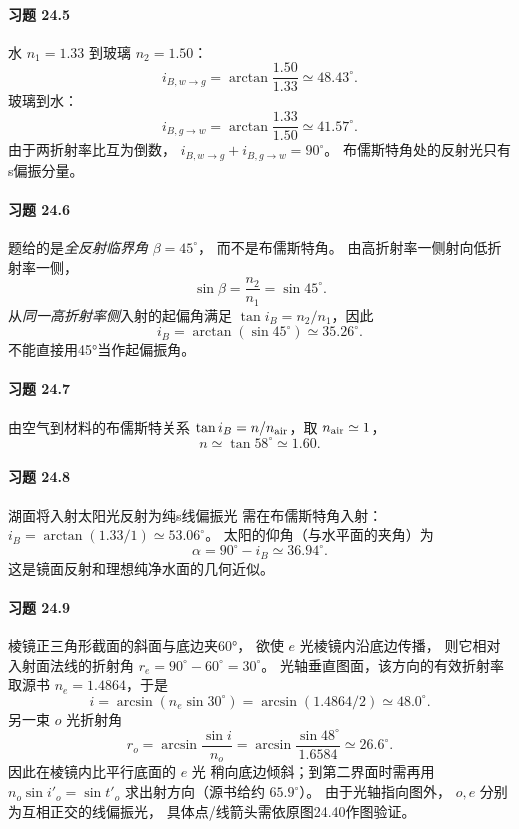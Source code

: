 \paragraph{习题 24.5}
水 \(n_1=1.33\) 到玻璃 \(n_2=1.50\)：
\[
\boxed{i_{B,w\to g}
=\arctan\frac{1.50}{1.33}\simeq48.43^\circ}.
\]
玻璃到水：
\[
\boxed{i_{B,g\to w}
=\arctan\frac{1.33}{1.50}\simeq41.57^\circ}.
\]
由于两折射率比互为倒数，
\(\boxed{i_{B,w\to g}+i_{B,g\to w}=90^\circ}\)。
布儒斯特角处的反射光只有s偏振分量。

\paragraph{习题 24.6}
题给的是\emph{全反射临界角} \(\beta=45^\circ\)，
而不是布儒斯特角。
由高折射率一侧射向低折射率一侧，
\[
\sin\beta=\frac{n_2}{n_1}=\sin45^\circ.
\]
从\emph{同一高折射率侧}入射的起偏角满足
\(\tan i_B=n_2/n_1\)，因此
\[
\boxed{i_B=\arctan(\sin45^\circ)
\simeq35.26^\circ}.
\]
不能直接用45°当作起偏振角。

\paragraph{习题 24.7}
由空气到材料的布儒斯特关系
\(\tan i_B=n/n_{\rm air}\)，取 \(n_{\rm air}\simeq1\)，
\[
\boxed{n\simeq\tan58^\circ\simeq1.60}.
\]

\paragraph{习题 24.8}
湖面将入射太阳光反射为纯s线偏振光
需在布儒斯特角入射：
\(i_B=\arctan(1.33/1)\simeq53.06^\circ\)。
太阳的仰角（与水平面的夹角）为
\[
\boxed{\alpha=90^\circ-i_B\simeq36.94^\circ}.
\]
这是镜面反射和理想纯净水面的几何近似。

\paragraph{习题 24.9}
棱镜正三角形截面的斜面与底边夹60°，
欲使 \(e\) 光棱镜内沿底边传播，
则它相对入射面法线的折射角
\(r_e=90^\circ-60^\circ=30^\circ\)。
光轴垂直图面，该方向的有效折射率
取源书 \(n_e=1.4864\)，于是
\[
\boxed{i=\arcsin(n_e\sin30^\circ)
=\arcsin(1.4864/2)\simeq48.0^\circ}.
\]
另一束 \(o\) 光折射角
\[
r_o=\arcsin\frac{\sin i}{n_o}
=\arcsin\frac{\sin48^\circ}{1.6584}
\simeq26.6^\circ.
\]
因此在棱镜内比平行底面的 \(e\) 光
稍向底边倾斜；到第二界面时需再用
\(n_o\sin i'_o=\sin t'_o\)
求出射方向（源书给约 \(65.9^\circ\)）。
由于光轴指向图外，
\(o,e\) 分别为互相正交的线偏振光，
具体点/线箭头需依原图24.40作图验证。

